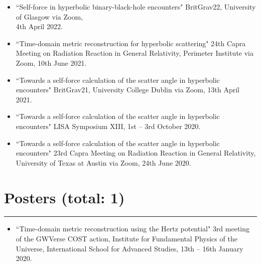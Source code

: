 \documentclass[10.5pt, oneside]{article}   	%
\begin{document}
\begin{itemize}
\item ``Self-force in hyperbolic binary-black-hole encounters" BritGrav22, University of Glasgow via Zoom, \\ 4th April 2022. \href{https://www.youtube.com/watch?v=zZEblkjb5IM}{}
\item ``Time-domain metric reconstruction for hyperbolic scattering" 24th Capra Meeting on Radiation Reaction in General Relativity, Perimeter Institute via Zoom, 10th June 2021. \href{https://pirsa.org/21060058}{}
\item ``Towards a self-force calculation of the scatter angle in hyperbolic encounters" BritGrav21, University College Dublin via Zoom, 13th April 2021. \href{https://oliverlong.info/talks/britgrav21}{}
\item``Towards a self-force calculation of the scatter angle in hyperbolic encounters" LISA Symposium XIII, 1st -- 3rd October 2020. \href{https://lisasymposium13.lisamission.org/presentations/i0xMnRFWi7WKbO5f01caGDH0zPK2/7qz7uYC3qHuzj9AsC49h}{}
\item ``Towards a self-force calculation of the scatter angle in hyperbolic encounters" 23rd Capra Meeting on Radiation Reaction in General Relativity, University of Texas at Austin via Zoom, 24th June 2020. \href{https://www.youtube.com/watch?v=HB-Rw5kRUfg&t=11311s}{}
\end{itemize} 
 
{\color{Sectioncolour}
\section*{Posters {\rm (total: 1)}}
\vspace{-3mm}
\noindent\rule{\linewidth}{0.6pt}}
\begin{itemize}
\item ``Time-domain metric reconstruction using the Hertz potential" 3rd meeting of the GWVerse COST action, Institute for Fundamental Physics of the Universe, International School for Advanced Studies, 13th -- 16th January 2020.
\end{itemize} 

 
\end{document}
